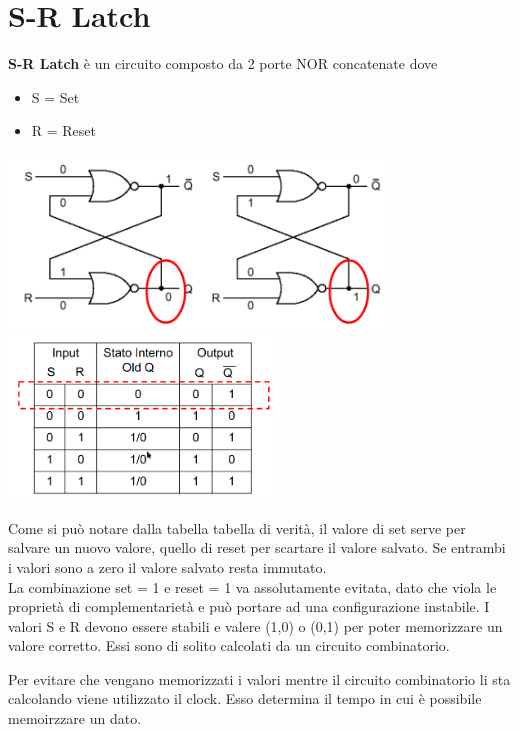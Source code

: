 \documentclass[12pt, a4paper, openany]{book}
\begin{document}
\section{S-R Latch}
\textbf{S-R Latch} è un circuito composto da 2 porte NOR concatenate dove
\begin{itemize}
    \item S = Set
    \item R = Reset
\end{itemize}
\begin{center}
    \includegraphics[width=100mm, scale=0.5]{sr_latch.png}
    \includegraphics[width=70mm, scale=0.5]{sr_latch_tabella.png}
\end{center}

Come si può notare dalla tabella tabella di verità, il valore di set serve per
salvare un nuovo valore, quello di reset per scartare il valore salvato. Se entrambi
i valori sono a zero il valore salvato resta immutato.
\\ La combinazione set = 1 e reset = 1 va assolutamente evitata, dato che viola le
proprietà di complementarietà e può portare ad una configurazione instabile.
I valori S e R devono essere stabili e valere (1,0) o (0,1) per poter memorizzare
un valore corretto. Essi sono di solito calcolati da un circuito combinatorio.

Per evitare che vengano memorizzati i valori mentre il circuito combinatorio li sta
calcolando viene utilizzato il clock. Esso determina il tempo in cui è possibile
memoirzzare un dato.
\end{document}
